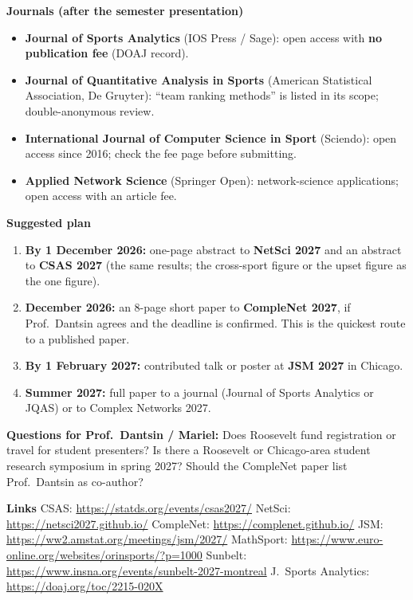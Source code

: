 \documentclass[10pt]{article}
\begin{document}
\textbf{Journals (after the semester presentation)}
\begin{itemize}[leftmargin=1.4em,itemsep=1pt,topsep=0pt]
\item \textbf{Journal of Sports Analytics} (IOS Press / Sage): open access with \textbf{no publication fee} (DOAJ record).
\item \textbf{Journal of Quantitative Analysis in Sports} (American Statistical Association, De Gruyter): ``team ranking methods'' is listed in its scope; double-anonymous review.
\item \textbf{International Journal of Computer Science in Sport} (Sciendo): open access since 2016; check the fee page before submitting.
\item \textbf{Applied Network Science} (Springer Open): network-science applications; open access with an article fee.
\end{itemize}

\textbf{Suggested plan}
\begin{enumerate}[leftmargin=1.4em,itemsep=1pt,topsep=0pt]
\item \textbf{By 1 December 2026:} one-page abstract to \textbf{NetSci 2027} and an abstract to \textbf{CSAS 2027} (the same results; the cross-sport figure or the upset figure as the one figure).
\item \textbf{December 2026:} an 8-page short paper to \textbf{CompleNet 2027}, if Prof.\ Dantsin agrees and the deadline is confirmed. This is the quickest route to a published paper.
\item \textbf{By 1 February 2027:} contributed talk or poster at \textbf{JSM 2027} in Chicago.
\item \textbf{Summer 2027:} full paper to a journal (Journal of Sports Analytics or JQAS) or to Complex Networks 2027.
\end{enumerate}

\textbf{Questions for Prof.\ Dantsin / Mariel:} Does Roosevelt fund registration or travel for student presenters? Is there a Roosevelt or Chicago-area student research symposium in spring 2027? Should the CompleNet paper list Prof.\ Dantsin as co-author?

\textbf{Links}\quad
CSAS: \url{https://statds.org/events/csas2027/} \quad
NetSci: \url{https://netsci2027.github.io/} \quad
CompleNet: \url{https://complenet.github.io/} \quad
JSM: \url{https://ww2.amstat.org/meetings/jsm/2027/} \quad
MathSport: \url{https://www.euro-online.org/websites/orinsports/?p=1000} \quad
Sunbelt: \url{https://www.insna.org/events/sunbelt-2027-montreal} \quad
J.\ Sports Analytics: \url{https://doaj.org/toc/2215-020X}
\end{document}
